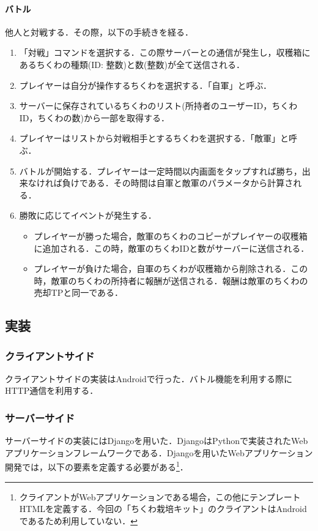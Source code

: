 \paragraph{バトル}
他人と対戦する．その際，以下の手続きを経る．

\begin{enumerate}
\item
「対戦」コマンドを選択する．この際サーバーとの通信が発生し，収穫箱にあるちくわの種類(ID: 整数)と数(整数)が全て送信される．
\item
プレイヤーは自分が操作するちくわを選択する．「自軍」と呼ぶ．
\item
サーバーに保存されているちくわのリスト(所持者のユーザーID，ちくわID，ちくわの数)から一部を取得する．
\item
プレイヤーはリストから対戦相手とするちくわを選択する．「敵軍」と呼ぶ．
\item
バトルが開始する．プレイヤーは一定時間以内画面をタップすれば勝ち，出来なければ負けである．その時間は自軍と敵軍のパラメータから計算される．
\item
勝敗に応じてイベントが発生する．
\begin{itemize}
\item
プレイヤーが勝った場合，敵軍のちくわのコピーがプレイヤーの収穫箱に追加される．この時，敵軍のちくわIDと数がサーバーに送信される．
\item
プレイヤーが負けた場合，自軍のちくわが収穫箱から削除される．この時，敵軍のちくわの所持者に報酬が送信される．報酬は敵軍のちくわの売却TPと同一である．
\end{itemize}
\end{enumerate}


\subsection{実装}
\subsubsection{クライアントサイド}
クライアントサイドの実装はAndroidで行った．バトル機能を利用する際にHTTP通信を利用する．

\subsubsection{サーバーサイド}
サーバーサイドの実装にはDjango\cite{django}を用いた．DjangoはPython\cite{python}で実装されたWebアプリケーションフレームワークである．Djangoを用いたWebアプリケーション開発では，以下の要素を定義する必要がある\footnote{クライアントがWebアプリケーションである場合，この他にテンプレートHTMLを定義する．今回の「ちくわ栽培キット」のクライアントはAndroidであるため利用していない．}．

